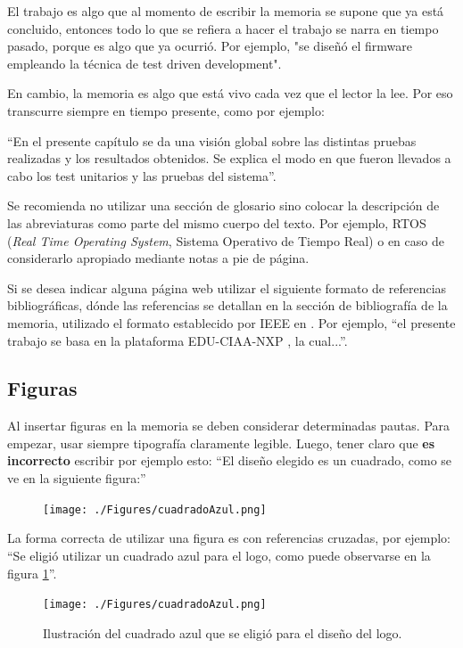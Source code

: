 El trabajo es algo que al momento de escribir la memoria se supone que ya está concluido, entonces todo lo que se refiera a hacer el trabajo se narra en tiempo pasado, porque es algo que ya ocurrió. Por ejemplo, "se diseñó el firmware empleando la técnica de test driven development".

En cambio, la memoria es algo que está vivo cada vez que el lector la lee. Por eso transcurre siempre en tiempo presente, como por ejemplo:

``En el presente capítulo se da una visión global sobre las distintas pruebas realizadas y los resultados obtenidos. Se explica el modo en que fueron llevados a cabo los test unitarios y las pruebas del sistema''.

Se recomienda no utilizar una sección de glosario sino colocar la descripción de las abreviaturas como parte del mismo cuerpo del texto. Por ejemplo, RTOS (\textit{Real Time Operating System}, Sistema Operativo de Tiempo Real) o en caso de considerarlo apropiado mediante notas a pie de página.

Si se desea indicar alguna página web utilizar el siguiente formato de referencias bibliográficas, dónde las referencias se detallan en la sección de bibliografía de la memoria, utilizado el formato establecido por IEEE en \citep{IEEE:citation}. Por ejemplo, ``el presente trabajo se basa en la plataforma EDU-CIAA-NXP \citep{CIAA}, la cual...''.

\subsection{Figuras} 

Al insertar figuras en la memoria se deben considerar determinadas pautas. Para empezar, usar siempre tipografía claramente legible. Luego, tener claro que \textbf{es incorrecto} escribir por ejemplo esto: ``El diseño elegido es un cuadrado, como se ve en la siguiente figura:''

\begin{figure}[h]
\centering
\texttt{[image: ./Figures/cuadradoAzul.png]}
\end{figure}

La forma correcta de utilizar una figura es con referencias cruzadas, por ejemplo: ``Se eligió utilizar un cuadrado azul para el logo, como puede observarse en la figura \ref{fig:cuadradoAzul}''.

\begin{figure}[ht]
	\centering
	\texttt{[image: ./Figures/cuadradoAzul.png]}
	\caption{Ilustración del cuadrado azul que se eligió para el diseño del logo.}
	\label{fig:cuadradoAzul}
\end{figure}

